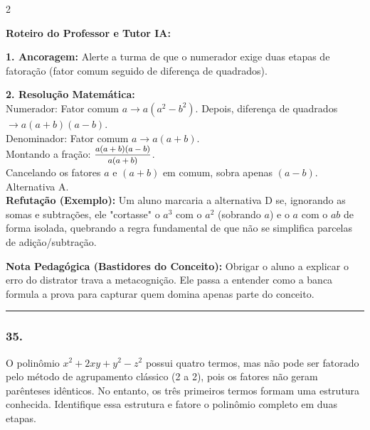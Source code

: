 \begin{multicols*}{2}
\ifgabarito
    \begin{tcolorbox}[colback=CorTitUm!5, colframe=CorTitUm, boxrule=1pt, arc=4pt, left=6pt, right=6pt, top=6pt, bottom=6pt]
    \small\textbf{\textcolor{CorTitUm}{Roteiro do Professor e Tutor IA:}}\par\vspace{0.1cm}
    \color{CinzaEscuro}
    \textbf{1. Ancoragem:} Alerte a turma de que o numerador exige duas etapas de fatoração (fator comum seguido de diferença de quadrados).\par\vspace{0.1cm}
    \textbf{2. Resolução Matemática:}\\
    Numerador: Fator comum $a \rightarrow a(a^2 - b^2)$. Depois, diferença de quadrados $\rightarrow a(a + b)(a - b)$.\\
    Denominador: Fator comum $a \rightarrow a(a + b)$.\\
    Montando a fração: $ \mfrac{a(a + b)(a - b)}{a(a + b)} $.\\
    Cancelando os fatores $a$ e $(a + b)$ em comum, sobra apenas $(a - b)$. Alternativa A.\\
    \textbf{Refutação (Exemplo):} Um aluno marcaria a alternativa D se, ignorando as somas e subtrações, ele "cortasse" o $a^3$ com o $a^2$ (sobrando $a$) e o $a$ com o $ab$ de forma isolada, quebrando a regra fundamental de que não se simplifica parcelas de adição/subtração.
    \end{tcolorbox}
    \vspace{0.15cm}
    
    \begin{boxexplicacao}
    \textbf{Nota Pedagógica (Bastidores do Conceito):} Obrigar o aluno a explicar o erro do distrator trava a metacognição. Ele passa a entender como a banca formula a prova para capturar quem domina apenas parte do conceito.
    \end{boxexplicacao}
\fi

\par\vspace{\espacoQuestao}

\noindent\textcolor{CorLinha}{\rule{\linewidth}{0.5pt}} 
\par\vspace{\espacoPreQuestao}
\subsubsection*{35.} 
\begin{enunciadoLiteral}
O polinômio $x^2 + 2xy + y^2 - z^2$ possui quatro termos, mas não pode ser fatorado pelo método de agrupamento clássico (2 a 2), pois os fatores não geram parênteses idênticos. No entanto, os três primeiros termos formam uma estrutura conhecida. Identifique essa estrutura e fatore o polinômio completo em duas etapas.
\end{enunciadoLiteral}


\end{multicols*}
